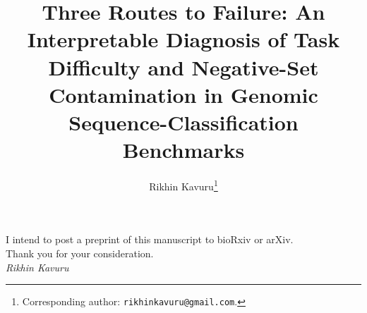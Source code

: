 \documentclass{ws-procs11x85}
\begin{document}
\noindent I intend to post a preprint of this manuscript to bioRxiv or arXiv.\\[6pt]

\noindent Thank you for your consideration.\\[6pt]
\noindent\textit{Rikhin Kavuru}

\clearpage

\title{Three Routes to Failure: An Interpretable Diagnosis of Task Difficulty and
Negative-Set Contamination in Genomic Sequence-Classification Benchmarks}

\author{Rikhin Kavuru\footnote{Corresponding author: \texttt{rikhinkavuru@gmail.com}.}}

\address{Independent Researcher,\\ Fort Wayne, Indiana, USA}
\end{document}
